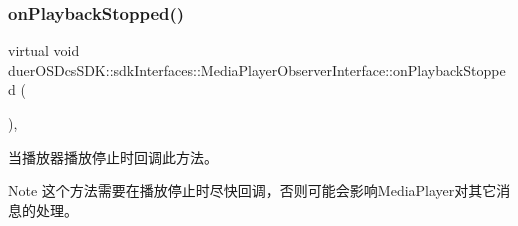\subsubsection{\texorpdfstring{on\+Playback\+Stopped()}{onPlaybackStopped()}}
{\footnotesize\ttfamily virtual void duer\+O\+S\+Dcs\+S\+D\+K\+::sdk\+Interfaces\+::\+Media\+Player\+Observer\+Interface\+::on\+Playback\+Stopped (\begin{DoxyParamCaption}{ }\end{DoxyParamCaption})\hspace{0.3cm}{\ttfamily [inline]}, {\ttfamily [virtual]}}



当播放器播放停止时回调此方法。 

\begin{DoxyNote}{Note}
这个方法需要在播放停止时尽快回调，否则可能会影响\+Media\+Player对其它消息的处理。 
\end{DoxyNote}
